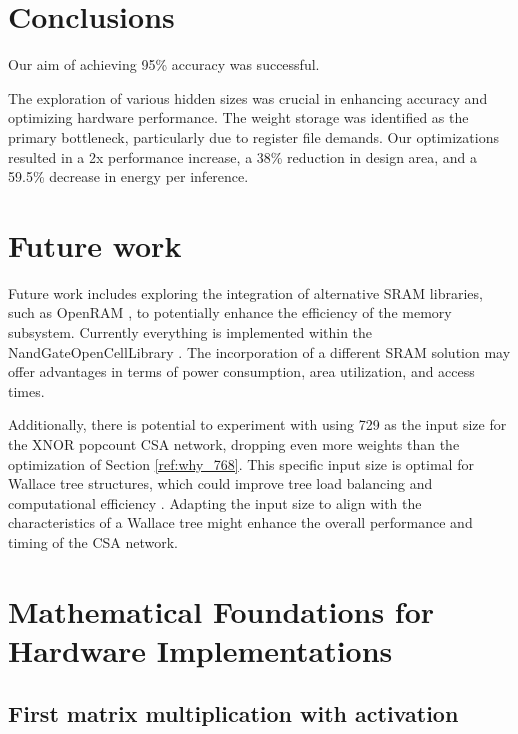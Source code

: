 \documentclass[conference]{IEEEtran}
\newcounter{todocount}
\newcommand{\todo}[1]{
  \stepcounter{todocount}
}
\begin{document}
\section{Conclusions}
\label{sec:conclusions}

Our aim of achieving 95\% accuracy was successful. 
\todo{this XX percent}
The exploration of various hidden sizes was crucial in enhancing accuracy and optimizing hardware performance. The weight storage was identified as the primary bottleneck, particularly due to register file demands. Our optimizations resulted in a 2x performance increase, a 38\% reduction in design area, and a 59.5\% decrease in energy per inference.


\section{Future work}
\label{sec:future}

Future work includes exploring the integration of alternative SRAM libraries, such as OpenRAM \cite{openram}, to potentially enhance the efficiency of the memory subsystem. Currently everything is implemented within the NandGateOpenCellLibrary \cite{nangate_lib}. The incorporation of a different SRAM solution may offer advantages in terms of power consumption, area utilization, and access times.

Additionally, there is potential to experiment with using 729 as the input size for the XNOR popcount CSA network, dropping even more weights than the optimization of Section \ref{ref:why_768}. This specific input size is optimal for Wallace tree structures, which could improve tree load balancing and computational efficiency \cite{wallace}. Adapting the input size to align with the characteristics of a Wallace tree might enhance the overall performance and timing of the CSA network.

\printbibliography


\appendix
\label{appendix}

\section{Mathematical Foundations for Hardware Implementations}

\label{appendix:bnn_maths}

\subsection{First matrix multiplication with activation}
\end{document}

